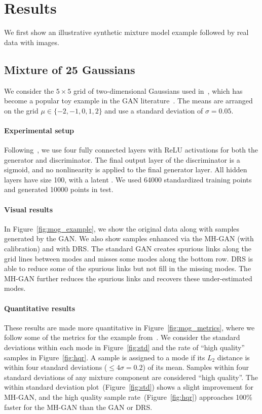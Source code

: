 \documentclass{article}
\renewcommand{\vec}[1]{{\boldsymbol{\mathbf{#1}}}} %
\newcommand{\R}{\mathbb{R}}
\begin{document}
\section{Results}
\label{sec:Results}

We first show an illustrative synthetic mixture model example followed by real data with images.

\subsection{Mixture of 25 Gaussians}

We consider the $5 \times 5$ grid of two-dimensional Gaussians used in~\citet{Azadi2018}, which has become a popular toy example in the GAN literature~\citep{Dumoulin2016}.
The means are arranged on the grid $\mu \in \{{-2},{-1},0,1,2\}$ and use a standard deviation of $\sigma = 0.05$.

\paragraph{Experimental setup}
Following~\citet{Azadi2018}, we use four fully connected layers with ReLU activations for both the generator and discriminator.
The final output layer of the discriminator is a sigmoid, and no nonlinearity is applied to the final generator layer.
All hidden layers have size 100, with a latent \smash{$\vec z \in \R^2$}.
We used \num{64000} standardized training points and generated \num{10000} points in test.

\paragraph{Visual results}
In Figure~\ref{fig:mog_example}, we show the original data along with samples generated by the GAN\@.
We also show samples enhanced via the MH-GAN (with calibration) and with DRS\@.
The standard GAN creates spurious links along the grid lines between modes and misses some modes along the bottom row.
DRS is able to reduce some of the spurious links but not fill in the missing modes.
The MH-GAN further reduces the spurious links and recovers these under-estimated modes.

\paragraph{Quantitative results}
These results are made more quantitative in Figure~\ref{fig:mog_metrics}, where we follow some of the metrics for the example from~\citet{Azadi2018}.
We consider the standard deviations within each mode in Figure~\ref{fig:std} and the rate of ``high quality'' samples in Figure~\ref{fig:hqr}.
A sample is assigned to a mode if its $L_2$ distance is within four standard deviations ($\leq 4 \sigma = 0.2$) of its mean.
Samples within four standard deviations of any mixture component are considered ``high quality''.
The within standard deviation plot~(Figure~\ref{fig:std}) shows a slight improvement for MH-GAN, and the high quality sample rate~(Figure~\ref{fig:hqr}) approaches 100\% faster for the MH-GAN than the GAN or DRS\@.
\end{document}
